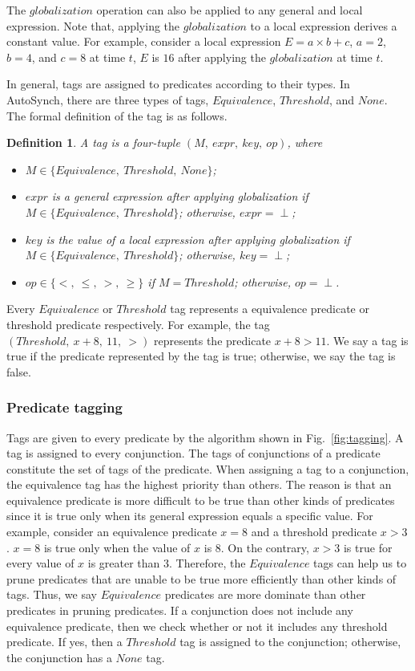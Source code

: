 \documentclass[preprint]{sigplanconf}
\newtheorem{definition}{Definition}
\begin{document}
The $globalization$ operation can also be applied to any general and local 
expression. Note that, applying the $globalization$ to a local expression
derives a constant value. For example, consider a local expression 
$E = a \times b + c$, $a = 2$, $b = 4$, and $c = 8$ at time $t$, $E$ is $16$
after applying the $globalization$ at time $t$. 

In general, tags are assigned to predicates according to their types. In 
AutoSynch, there are three types of tags, $Equivalence$, $Threshold$, and 
$None$. The formal definition of the tag is as follows. 
\begin{definition}
   A tag is a four-tuple $(M,\ expr,\ key,\ op)$, where  
   \begin{itemize}
      \item $M \in \{Equivalence,\ Threshold,\ None\}$;
      \item $expr$ is a general expression after applying globalization if 
          $M \in \{Equivalence,\ Threshold\}$; otherwise, $expr= \perp$;
      \item $key$ is the value of a local expression after applying
          globalization if $M \in \{Equivalence,\ Threshold\}$; otherwise, 
          $key= \perp$;
      \item $op \in \{<,\ \le,\ >,\ \ge\}$ if $M = Threshold$; otherwise, 
         $op = \perp$.
   \end{itemize}
\end{definition}
Every $Equivalence$ or $Threshold$ tag represents a equivalence predicate or 
threshold predicate respectively. For example, the tag 
$(Threshold,\ x + 8,\ 11,\ >)$ represents the predicate $x + 8 > 11$. 
We say a tag is true if the predicate represented by the tag is true; 
otherwise, we say the tag is false. 
\subsubsection{Predicate tagging}
Tags are given to every predicate by the algorithm shown in
Fig.~\ref{fig:tagging}. A tag is assigned to every conjunction. The tags of 
conjunctions of a predicate constitute the set of tags of the predicate. 
When assigning a tag to a conjunction, the equivalence tag has the highest 
priority than others. The reason is that an equivalence predicate is more
difficult to be true than other kinds of predicates since it is true only when 
its general expression equals a specific value. 
For example, consider an equivalence 
predicate $x = 8$ and a threshold predicate $x > 3$. $x = 8$ is true only when 
the value of $x$ is $8$. On the contrary, $x > 3$ is true for every value of 
$x$ is greater than $3$. Therefore, the $Equivalence$ tags can help us to prune
predicates that are unable to be true more efficiently than other kinds of
tags. Thus, we say $Equivalence$ predicates are more dominate than other
predicates in pruning predicates.  
If a conjunction does not 
include any equivalence predicate, then we check whether or not it 
includes any threshold predicate. If yes, then a $Threshold$ tag is assigned 
to the conjunction; otherwise, the conjunction has a $None$ tag. 
\end{document}
